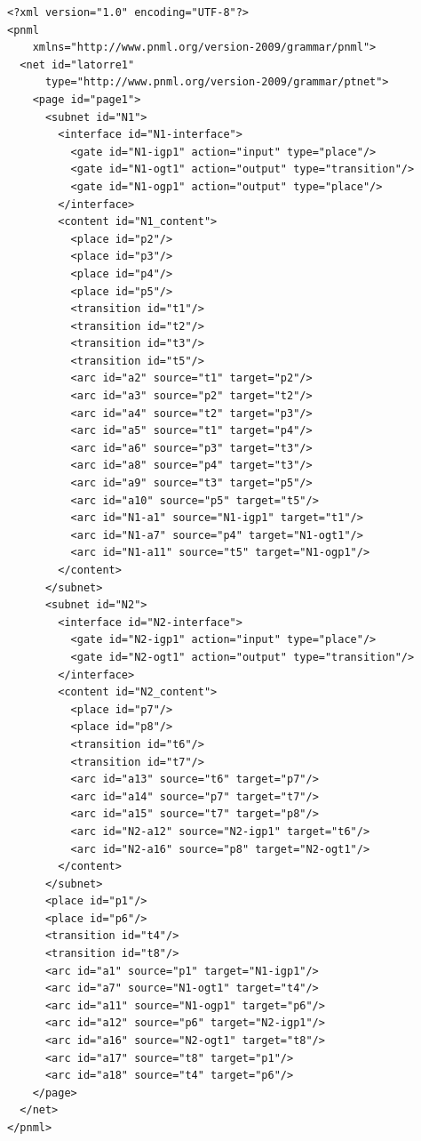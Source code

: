 \begin{lstlisting}
<?xml version="1.0" encoding="UTF-8"?>
<pnml
    xmlns="http://www.pnml.org/version-2009/grammar/pnml">
  <net id="latorre1"
      type="http://www.pnml.org/version-2009/grammar/ptnet">
    <page id="page1">
      <subnet id="N1">
        <interface id="N1-interface">
          <gate id="N1-igp1" action="input" type="place"/>
          <gate id="N1-ogt1" action="output" type="transition"/>
          <gate id="N1-ogp1" action="output" type="place"/>
        </interface>
        <content id="N1_content">
          <place id="p2"/>
          <place id="p3"/>
          <place id="p4"/>
          <place id="p5"/>
          <transition id="t1"/>
          <transition id="t2"/>
          <transition id="t3"/>
          <transition id="t5"/>
          <arc id="a2" source="t1" target="p2"/>
          <arc id="a3" source="p2" target="t2"/>
          <arc id="a4" source="t2" target="p3"/>
          <arc id="a5" source="t1" target="p4"/>
          <arc id="a6" source="p3" target="t3"/>
          <arc id="a8" source="p4" target="t3"/>
          <arc id="a9" source="t3" target="p5"/>
          <arc id="a10" source="p5" target="t5"/>
          <arc id="N1-a1" source="N1-igp1" target="t1"/>
          <arc id="N1-a7" source="p4" target="N1-ogt1"/>
          <arc id="N1-a11" source="t5" target="N1-ogp1"/>
        </content>
      </subnet>
      <subnet id="N2">
        <interface id="N2-interface">
          <gate id="N2-igp1" action="input" type="place"/>
          <gate id="N2-ogt1" action="output" type="transition"/>
        </interface>
        <content id="N2_content">
          <place id="p7"/>
          <place id="p8"/>
          <transition id="t6"/>
          <transition id="t7"/>
          <arc id="a13" source="t6" target="p7"/>
          <arc id="a14" source="p7" target="t7"/>
          <arc id="a15" source="t7" target="p8"/>
          <arc id="N2-a12" source="N2-igp1" target="t6"/>
          <arc id="N2-a16" source="p8" target="N2-ogt1"/>
        </content>
      </subnet>
      <place id="p1"/>
      <place id="p6"/>
      <transition id="t4"/>
      <transition id="t8"/>
      <arc id="a1" source="p1" target="N1-igp1"/>
      <arc id="a7" source="N1-ogt1" target="t4"/>
      <arc id="a11" source="N1-ogp1" target="p6"/>
      <arc id="a12" source="p6" target="N2-igp1"/>
      <arc id="a16" source="N2-ogt1" target="t8"/>
      <arc id="a17" source="t8" target="p1"/>
      <arc id="a18" source="t4" target="p6"/>
    </page>
  </net>
</pnml>
\end{lstlisting}  


